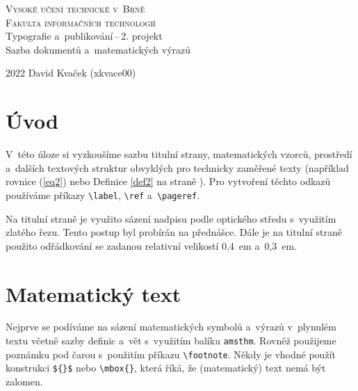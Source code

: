 \documentclass[twocolumn, a4paper, 11pt]{article}
\begin{document}
\begin{titlepage}
    \begin{center}
        \Huge\textsc{Vysoké učení technické v~Brně} \\[0.1em]
        \huge\textsc{Fakulta informačních technologií} \\
        \LARGE{Typografie a~publikování\,--\,2. projekt} \\[0.1em]
        \LARGE{Sazba dokumentů a~matematických výrazů} \\
    \end{center}
    \Large{2022 \hfill David Kvaček (xkvace00)}
\end{titlepage}

\section*{Úvod}
V~této úloze si vyzkoušíme sazbu titulní strany, matematic\-kých vzorců, prostředí a~dalších textových struktur obvyklých pro technicky zaměřené texty (například rovnice (\ref{eq2}) nebo Definice \ref{def2} na straně \pageref{def2}).
Pro vytvoření těchto odkazů používáme příkazy \verb|\label|, \verb|\ref| a~\verb|\pageref|.

Na titulní straně je využito sázení nadpisu podle optického středu s~využitím zlatého řezu.
Tento postup byl probírán na přednášce.
Dále je na titulní straně použito odřádkování se zadanou relativní velikostí 0,4~em a~0,3~em.

\section{Matematický text}
Nejprve se podíváme na sázení matematických symbolů a~výrazů v~plynulém textu včetně sazby definic a~vět s~využitím balíku \verb|amsthm|.
Rovněž použijeme poznámku pod čarou s~použitím příkazu \verb|\footnote|.
Někdy je vhodné použít konstrukci \verb|${}$| nebo \verb|\mbox{}|, která říká, že (matematický) text nemá být zalomen.
\end{document}
